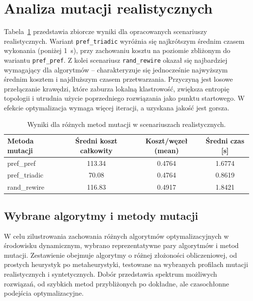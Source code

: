 \section{Analiza mutacji realistycznych}
Tabela~\ref{tab:dyn-real-warm} przedstawia zbiorcze wyniki dla opracowanych scenariuszy realistycznych. Wariant \texttt{pref\_triadic} wyróżnia się najkrótszym średnim czasem wykonania (poniżej \SI{1}{\second}), przy zachowaniu kosztu na poziomie zbliżonym do wariantu \texttt{pref\_pref}. Z kolei scenariusz \texttt{rand\_rewire} okazał się najbardziej wymagający dla algorytmów -- charakteryzuje się jednocześnie najwyższym średnim kosztem i najdłuższym czasem przetwarzania. Przyczyną jest losowe przełączanie krawędzi, które zaburza lokalną klastrowość, zwiększa entropię topologii i utrudnia użycie poprzedniego rozwiązania jako punktu startowego. W efekcie optymalizacja wymaga więcej iteracji, a uzyskana jakość jest gorsza.


\begin{table}[H]
    \centering
    \caption{Wyniki dla różnych metod mutacji w scenariuszach realistycznych.}
    \label{tab:dyn-real-warm}
    \begin{tabular}{lccc}
        \toprule
        \textbf{Metoda mutacji} & \textbf{Średni koszt całkowity} & \textbf{Koszt/węzeł (mean)} & \textbf{Średni czas [s]} \\
        \midrule
        pref\_pref              & 113.34                          & 0.4764                      & 1.6774                   \\
        pref\_triadic           & 70.08                           & 0.4764                      & 0.8619                   \\
        rand\_rewire            & 116.83                          & 0.4917                      & 1.8421                   \\
        \bottomrule
    \end{tabular}
\end{table}

\subsection{Wybrane algorytmy i metody mutacji}
W celu zilustrowania zachowania różnych algorytmów optymalizacyjnych w środowisku dynamicznym, wybrano reprezentatywne pary algorytmów i metod mutacji. Zestawienie obejmuje algorytmy o różnej złożoności obliczeniowej, od prostych heurystyk po metaheurystyki, testowane na wybranych profilach mutacji realistycznych i syntetycznych. Dobór przedstawia spektrum możliwych rozwiązań, od szybkich metod przybliżonych po dokładne, ale czasochłonne podejścia optymalizacyjne.

